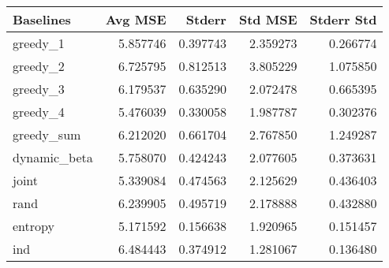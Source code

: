 \begin{tabular}{lrrrr}
\toprule
    Baselines &   Avg MSE &    Stderr &   Std MSE &  Stderr Std \\
\midrule
     greedy\_1 &  5.857746 &  0.397743 &  2.359273 &    0.266774 \\
     greedy\_2 &  6.725795 &  0.812513 &  3.805229 &    1.075850 \\
     greedy\_3 &  6.179537 &  0.635290 &  2.072478 &    0.665395 \\
     greedy\_4 &  5.476039 &  0.330058 &  1.987787 &    0.302376 \\
   greedy\_sum &  6.212020 &  0.661704 &  2.767850 &    1.249287 \\
 dynamic\_beta &  5.758070 &  0.424243 &  2.077605 &    0.373631 \\
        joint &  5.339084 &  0.474563 &  2.125629 &    0.436403 \\
         rand &  6.239905 &  0.495719 &  2.178888 &    0.432880 \\
      entropy &  5.171592 &  0.156638 &  1.920965 &    0.151457 \\
 ind &  6.484443 &  0.374912 &  1.281067 &    0.136480 \\
\bottomrule
\end{tabular}
